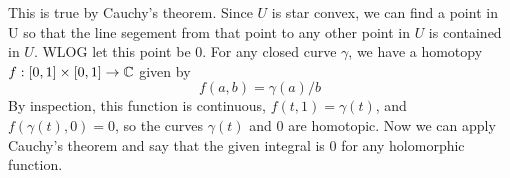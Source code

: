 \documentclass{homework}
\begin{document}
                                                                                                                                                                                                                                                                                                                                                    \begin{solution}
                                                                                                                                                                                                                                                                                                                                                    This is true by Cauchy's theorem. Since $U$ is star convex, we can find a point in U so that the line segement from that point to any other point in $U$ is contained in $U$. WLOG let this point be 0.
                                                                                                                                                                                                                                                                                                                                                    For any closed curve $\gamma$, we have a homotopy $f:[0, 1]\times [0, 1] \to \mathbb{C}$ given by 
                                                                                                                                                                                                                                                                                                                                                    \[
                                                                                                                                                                                                                                                                                                                                                    f(a, b) = \gamma(a)/b
                                                                                                                                                                                                                                                                                                                                                    \]
                                                                                                                                                                                                                                                                                                                                                    By inspection, this function is continuous, $f(t, 1)=\gamma(t)$, and $f(\gamma(t),0)= 0$, so the curves $\gamma(t)$ and $0$ are homotopic. Now we can apply Cauchy's theorem and say that the given integral is 0 for any holomorphic function.
                                                                                                                                                                                                                                                                                                                                                    \end{solution}
\end{document}
